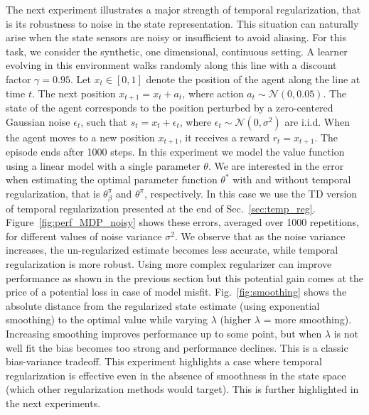\documentclass{article}
\newcommand{\param}{\beta}
\begin{document}
The next experiment illustrates a major strength of temporal regularization, that is its robustness to noise in the state representation. This situation can naturally arise when the state sensors are noisy or insufficient to avoid aliasing. For this task, we consider the synthetic, one dimensional, continuous setting. A learner evolving in this environment walks randomly along this line with a discount factor $\gamma=0.95$. Let $x_t\in [0,1]$ denote the position of the agent along the line at time $t$. The next position $x_{t+1} = x_t + a_t$, where action $a_t\sim\mathcal{N}(0, 0.05)$. The state of the agent corresponds to the position perturbed by a zero-centered Gaussian noise $\epsilon_t$, such that $s_t = x_t + \epsilon_t$, where $\epsilon_t\sim\mathcal{N}(0,\sigma^2)$ are i.i.d. When the agent moves to a new position $x_{t+1}$, it receives a reward $r_t = x_{t+1}$. The episode ends after 1000 steps. In this experiment we model the value function using a linear model with a single parameter $\theta$. We are interested in the error when estimating the optimal parameter function $\theta^*$ with and without temporal regularization, that is $\theta^\pi_\param$ and $\theta^\pi$, respectively. In this case we use the TD version of temporal regularization presented at the end of Sec.~\ref{sec:temp_reg}.
Figure~\ref{fig:perf_MDP_noisy} shows these errors, averaged over 1000 repetitions, for different values of noise variance $\sigma^2$. We observe that as the noise variance increases, the un-regularized estimate becomes less accurate, while temporal regularization is more robust. Using more complex regularizer can improve performance as shown in the previous section but this potential gain comes at the price of a potential loss in case of model misfit. Fig.~\ref{fig:smoothing} shows the absolute distance from the regularized state estimate (using exponential smoothing) to the optimal value while varying $\lambda$ (higher $\lambda$ = more smoothing). Increasing smoothing improves performance up to some point, but when $\lambda$ is not well fit the bias becomes too strong and performance declines. This is a classic bias-variance tradeoff. This experiment highlights a case where temporal regularization is effective even in the absence of smoothness in the state space (which other regularization methods would target). This is further highlighted in the next experiments.
\end{document}
